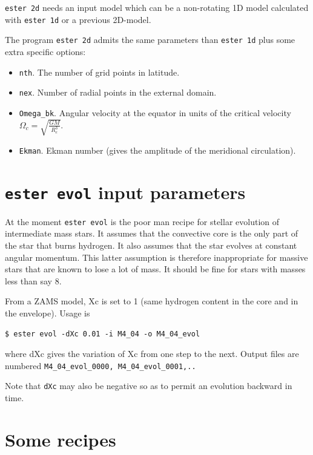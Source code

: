 {\tt ester 2d} needs an input model which can be a non-rotating 1D model
calculated with {\tt ester 1d} or a previous 2D-model.

The program {\tt ester 2d} admits the same parameters than {\tt ester 1d}
plus some extra specific options:

\begin{itemize}
\item {\tt nth}. The number of grid points in latitude.
\item {\tt nex}. Number of radial points in the external domain.
\item {\tt Omega\_bk}. Angular velocity at the equator in units of the critical velocity
$\Omega_c=\sqrt{\frac{GM}{R_e^3}}$.
\item {\tt Ekman}. Ekman number (gives the amplitude of the meridional circulation).
\end{itemize}

\section{{\tt ester evol} input parameters}

At the moment {\tt ester evol} is the poor man recipe for stellar
evolution of intermediate mass stars. It assumes that the convective core
is the only part of the star that burns hydrogen. It also assumes that
the star evolves at constant angular momentum. This latter assumption
is therefore inappropriate for massive stars that are known to lose a
lot of mass. It should be fine for stars with masses less than say 8\msun.

From a ZAMS model, Xc is set to 1 (same hydrogen content in the core and in
the envelope). Usage is 

\begin{verbatim}
$ ester evol -dXc 0.01 -i M4_04 -o M4_04_evol
\end{verbatim}

\noindent where  dXc gives the variation of Xc from one step to the next. Output
files are numbered {\tt M4\_04\_evol\_0000, M4\_04\_evol\_0001,..}

Note that {\tt dXc} may also be negative so as to permit an evolution
backward in time.





\section{Some recipes}

